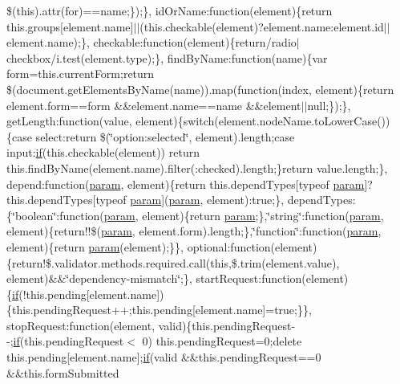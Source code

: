\begin{DoxyCompactItemize}
\$(this).attr(\textquotesingle{}for\textquotesingle{})==name;\});\}, id\+Or\+Name\+:function(element)\{return this.\+groups\mbox{[}element.\+name\mbox{]}$\vert$$\vert$(this.\+checkable(element)?element.\+name\+:element.\+id$\vert$$\vert$element.\+name);\}, checkable\+:function(element)\{return/radio$\vert$checkbox/i.\+test(element.\+type);\}, find\+By\+Name\+:function(name)\{var form=this.\+current\+Form;return \$(document.\+get\+Elements\+By\+Name(name)).map(function(index, element)\{return element.\+form==form \&\&element.\+name==name \&\&element$\vert$$\vert$null;\});\}, get\+Length\+:function(value, element)\{switch(element.\+node\+Name.\+to\+Lower\+Case())\{case \textquotesingle{}select\textquotesingle{}\+:return \$(\char`\"{}option\+:selected\char`\"{}, element).length;case \textquotesingle{}input\textquotesingle{}\+:\hyperlink{_scripts_2respond_8min_8js_a93851d60dd037a83509a1757b9ee7b66}{if}(this.\+checkable(element)) return this.\+find\+By\+Name(element.\+name).filter(\textquotesingle{}\+:checked\textquotesingle{}).length;\}return value.\+length;\}, depend\+:function(\hyperlink{_scripts_2jquery-1_810_82_8min_8js_ae8915303d11557d1b001bc56b6195251}{param}, element)\{return this.\+depend\+Types\mbox{[}typeof \hyperlink{_scripts_2jquery-1_810_82_8min_8js_ae8915303d11557d1b001bc56b6195251}{param}\mbox{]}?this.\+depend\+Types\mbox{[}typeof \hyperlink{_scripts_2jquery-1_810_82_8min_8js_ae8915303d11557d1b001bc56b6195251}{param}\mbox{]}(\hyperlink{_scripts_2jquery-1_810_82_8min_8js_ae8915303d11557d1b001bc56b6195251}{param}, element)\+:true;\}, depend\+Types\+:\{\char`\"{}boolean\char`\"{}\+:function(\hyperlink{_scripts_2jquery-1_810_82_8min_8js_ae8915303d11557d1b001bc56b6195251}{param}, element)\{return \hyperlink{_scripts_2jquery-1_810_82_8min_8js_ae8915303d11557d1b001bc56b6195251}{param};\},\char`\"{}string\char`\"{}\+:function(\hyperlink{_scripts_2jquery-1_810_82_8min_8js_ae8915303d11557d1b001bc56b6195251}{param}, element)\{return!!\$(\hyperlink{_scripts_2jquery-1_810_82_8min_8js_ae8915303d11557d1b001bc56b6195251}{param}, element.\+form).length;\},\char`\"{}function\char`\"{}\+:function(\hyperlink{_scripts_2jquery-1_810_82_8min_8js_ae8915303d11557d1b001bc56b6195251}{param}, element)\{return \hyperlink{_scripts_2jquery-1_810_82_8min_8js_ae8915303d11557d1b001bc56b6195251}{param}(element);\}\}, optional\+:function(element)\{return!\$.\+validator.\+methods.\+required.\+call(this,\$.trim(element.\+value), element)\&\&\char`\"{}dependency-\/mismatch\char`\"{};\}, start\+Request\+:function(element)\{\hyperlink{_scripts_2respond_8min_8js_a93851d60dd037a83509a1757b9ee7b66}{if}(!this.\+pending\mbox{[}element.\+name\mbox{]})\{this.\+pending\+Request++;this.\+pending\mbox{[}element.\+name\mbox{]}=true;\}\}, stop\+Request\+:function(element, valid)\{this.\+pending\+Request-\/-\/;\hyperlink{_scripts_2respond_8min_8js_a93851d60dd037a83509a1757b9ee7b66}{if}(this.\+pending\+Request$<$ 0) this.\+pending\+Request=0;delete this.\+pending\mbox{[}element.\+name\mbox{]};\hyperlink{_scripts_2respond_8min_8js_a93851d60dd037a83509a1757b9ee7b66}{if}(valid \&\&this.\+pending\+Request==0 \&\&this.\+form\+Submitted 
\end{DoxyCompactItemize}
